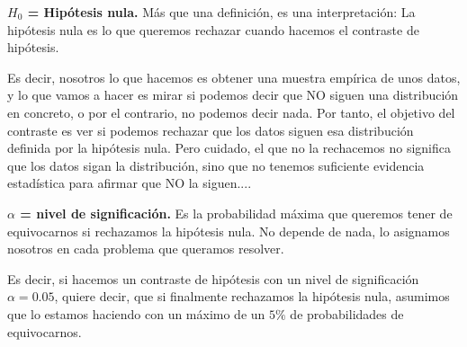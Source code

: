 \documentclass[nochap]{apuntes}
\begin{document}
\begin{defn}{\textbf{$H_0$ = Hipótesis nula. }}
Más que una definición, es una interpretación: La hipótesis nula es lo que queremos rechazar cuando hacemos el contraste de hipótesis.

\begin{expla}
Es decir, nosotros lo que hacemos es obtener una muestra empírica de unos datos, y lo que vamos a hacer es mirar si podemos decir que NO siguen una distribución en concreto, o por el contrario, no podemos decir nada. Por tanto, el objetivo del contraste es ver si podemos rechazar que los datos siguen esa distribución definida por la hipótesis nula. Pero cuidado, el que no la rechacemos no significa que los datos sigan la distribución, sino que no tenemos suficiente evidencia estadística para afirmar que NO la siguen....
\end{expla}
\end{defn}


\begin{defn}{\textbf{$\alpha$ = nivel de significación. }}
Es la probabilidad máxima que queremos tener de equivocarnos si rechazamos la hipótesis nula. No depende de nada, lo asignamos nosotros en cada problema que queramos resolver.

\begin{expla}
Es decir, si hacemos un contraste de hipótesis con un nivel de significación $\alpha =0.05$, quiere decir, que si finalmente rechazamos la hipótesis nula, asumimos que lo estamos haciendo con un máximo de un $5\%$ de probabilidades de equivocarnos.
\end{expla}
\end{defn}
\end{document}
